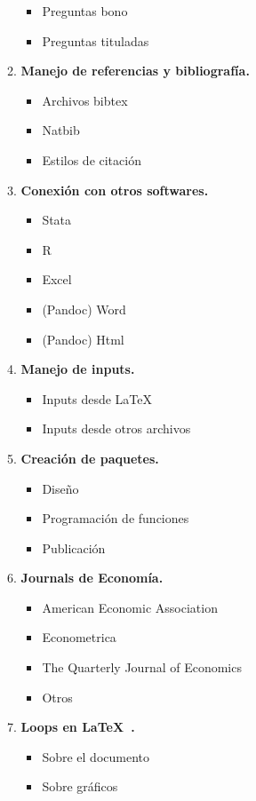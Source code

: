 \documentclass[11pt]{article}
\begin{document}
\begin{enumerate}
\begin{multicols}{2}
\begin{enumerate}[start=1,label={\bfseries \arabic*.},leftmargin=1cm]
\begin{itemize}
            \item Preguntas bono
            \item Preguntas tituladas
        \end{itemize}
    \item \textbf{Manejo de referencias y bibliografía.}
        \begin{itemize}
            \item Archivos bibtex
            \item Natbib
            \item Estilos de citación
        \end{itemize}
    \item \textbf{Conexión con otros softwares.}
        \begin{itemize}
            \item Stata 
            \item R
            \item Excel
            \item (Pandoc) Word
            \item (Pandoc) Html
        \end{itemize}
    \item \textbf{Manejo de inputs.}
        \begin{itemize}
            \item Inputs desde \LaTeX
            \item Inputs desde otros archivos
        \end{itemize}
    \item \textbf{Creación de paquetes.}
        \begin{itemize}
            \item Diseño
            \item Programación de funciones
            \item Publicación
        \end{itemize}
    \item \textbf{Journals de Economía.}
        \begin{itemize}
            \item American Economic Association
            \item Econometrica
            \item The Quarterly Journal of Economics
            \item Otros
        \end{itemize}
    \item \textbf{Loops en \LaTeX\ .}
        \begin{itemize}
            \item Sobre el documento
            \item Sobre gráficos
        \end{itemize}
    

\end{enumerate}
\end{multicols}
\end{enumerate}
\end{document}
